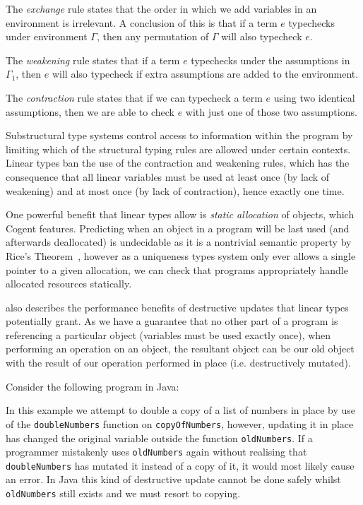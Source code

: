 The \textit{exchange} rule states that the order in which we add variables in an environment
is irrelevant. A conclusion of this is that if a term $e$ typechecks under environment $\Gamma$,
then any permutation of $\Gamma$ will also typecheck $e$.

The \textit{weakening} rule states that if a term $e$ typechecks under the assumptions
in $\Gamma_1$, then $e$ will also typecheck if extra assumptions are added to the environment.

The \textit{contraction} rule states that if we can typecheck a term $e$ using two identical
assumptions, then we are able to check $e$ with just one of those two assumptions.

Substructural type systems control access to information within the program by limiting which
of the structural typing rules are allowed under certain contexts. Linear types ban the use of the
contraction and weakening rules, which has the consequence that all linear variables must be used 
at least once (by lack of weakening) and at most once (by lack of contraction), hence exactly one time.

One powerful benefit that linear types allow is \textit{static allocation} of objects, which Cogent
features. Predicting when an object in a program will be last used (and afterwards deallocated)
is undecidable as it is a nontrivial semantic property by Rice's Theorem~\citep{Sipser},
however as a uniqueness types system only ever allows a single pointer to a given allocation, we
can check that programs appropriately handle allocated resources statically.

\citet{LinearTypesChangeTheWorld} also describes the performance benefits of destructive updates
that linear types potentially grant. As we have a guarantee that no other part of a program is
referencing a particular object (variables must be used exactly once), when performing
an operation on an object, the resultant object can be our old object with the result
of our operation performed in place (i.e. destructively mutated).

Consider the following program in Java:



In this example we attempt to double a copy of a list of numbers in place by use of the \verb|doubleNumbers|
function on \verb|copyOfNumbers|, however, updating it in place has changed the original variable outside
the function \verb|oldNumbers|. If a programmer mistakenly uses \verb|oldNumbers| again without realising that
\verb|doubleNumbers| has mutated it instead of a copy of it, it would most likely cause an error. In 
Java this kind of destructive update cannot be done safely whilst \verb|oldNumbers| still exists and we
must resort to copying.

